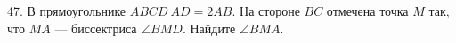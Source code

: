 47. В прямоугольнике $ABCD\ AD=2AB.$ На стороне $BC$ отмечена точка $M$ так, что $MA$ --- биссектриса $\angle BMD.$ Найдите $\angle BMA.$\\
